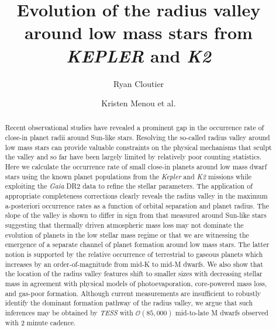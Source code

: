 \documentclass[twocolumn]{emulateapj}
\newcommand{\gaia}[1]{\emph{Gaia}#1}
\newcommand{\kepler}[1]{\emph{Kepler}#1}
\newcommand{\ktwo}[1]{\emph{K2}#1}
\newcommand{\tess}[1]{\emph{TESS}#1}
\begin{document}
\title{Evolution of the radius valley around low mass stars from \emph{KEPLER} and \emph{K2}}
\author{Ryan Cloutier}
\author{Kristen Menou et al.}




\begin{abstract}
  Recent observational studies have revealed a prominent gap in the occurrence rate
  of close-in planet radii around Sun-like stars.
  Resolving the so-called radius valley around low mass stars can provide valuable
  constraints on the physical mechanisms that sculpt the valley and so far have been largely limited
  by relatively poor counting statistics.
  Here we calculate the occurrence rate of small close-in planets around low mass dwarf stars
  using the known planet populations from the \kepler{} and \ktwo{} missions while
  exploiting the \gaia{} DR2 data to refine the stellar parameters. 
  The application of appropriate completeness corrections %
  clearly reveals the radius valley in the maximum a-posteriori occurrence rates as a
  function of orbital separation and planet radius. The slope of the valley %
  is shown to differ in sign from that measured around Sun-like stars suggesting that
  thermally driven atmospheric mass loss may not dominate the evolution of planets in the low stellar mass
  regime or that we are witnessing the emergence of a separate channel of planet formation around  
  low mass stars. The latter notion is supported by the relative occurrence of terrestrial to gaseous planets
  which increases by an order-of-magnitude from mid-K to mid-M dwarfs.
  We also show that the location of the radius valley features shift to smaller sizes with
  decreasing stellar mass in agreement with physical models of photoevaporation,
  core-powered mass loss, and gas-poor formation. Although current measurements are
  insufficient to robustly identify the dominant formation pathway of the radius valley,
  we argue that such inferences may be obtained by \tess{} with $\mathcal{O}(85,000)$
  mid-to-late M dwarfs observed with 2 minute cadence.
\end{abstract}
\end{document}
